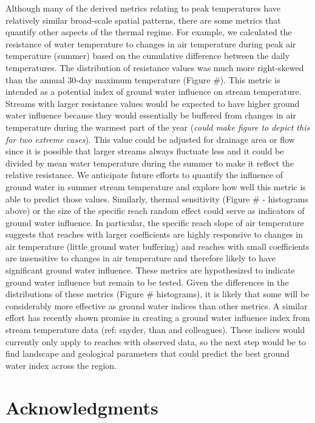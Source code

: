Although many of the derived metrics relating to peak temperatures have
relatively similar broad-scale spatial patterns, there are some metrics
that quantify other aspects of the thermal regime. For example, we
calculated the resistance of water temperature to changes in air
temperature during peak air temperature (summer) based on the cumulative
difference between the daily temperatures. The distribution of
resistance values was much more right-skewed than the annual 30-day
maximum temperature (Figure \#). This metric is intended as a potential
index of ground water influence on stream temperature. Streams with
larger resistance values would be expected to have higher ground water
influence because they would essentially be buffered from changes in air
temperature during the warmest part of the year (\emph{could make figure
to depict this for two extreme cases}). This value could be adjusted for
drainage area or flow since it is possible that larger streams always
fluctuate less and it could be divided by mean water temperature during
the summer to make it reflect the relative resistance. We anticipate
future efforts to quantify the influence of ground water in summer
stream temperature and explore how well this metric is able to predict
those values. Similarly, thermal sensitivity (Figure \# - histograms
above) or the size of the specific reach random effect could serve as
indicators of ground water influence. In particular, the specific reach
slope of air temperature suggests that reaches with larger coefficients
are highly responsive to changes in air temperature (little ground water
buffering) and reaches with small coefficients are insensitive to
changes in air temperature and therefore likely to have significant
ground water influence. These metrics are hypothesized to indicate
ground water influence but remain to be tested. Given the differences in
the distributions of these metrics (Figure \# histograms), it is likely
that some will be considerably more effective as ground water indices
than other metrics. A similar effort has recently shown promise in
creating a ground water influence index from stream temperature data
(ref: snyder, than and colleagues). These indices would currently only
apply to reaches with observed data, so the next step would be to find
landscape and geological parameters that could predict the best ground
water index across the region.

\section{Acknowledgments}\label{acknowledgments}

